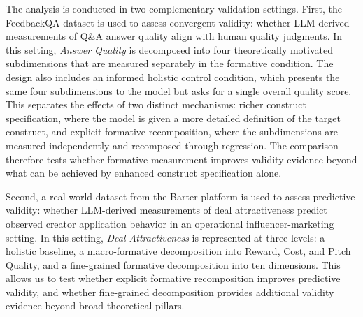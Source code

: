 

The analysis is conducted in two complementary validation settings. First, the FeedbackQA dataset \citep{li_using_2022} is used to assess convergent validity: whether LLM-derived measurements of Q\&A answer quality align with human quality judgments. In this setting, \textit{Answer Quality} is decomposed into four theoretically motivated subdimensions that are measured separately in the formative condition. The design also includes an informed holistic control condition, which presents the same four subdimensions to the model but asks for a single overall quality score. This separates the effects of two distinct mechanisms: richer construct specification, where the model is given a more detailed definition of the target construct, and explicit formative recomposition, where the subdimensions are measured independently and recomposed through regression. The comparison therefore tests whether formative measurement improves validity evidence beyond what can be achieved by enhanced construct specification alone.

Second, a real-world dataset from the Barter platform is used to assess predictive validity: whether LLM-derived measurements of deal attractiveness predict observed creator application behavior in an operational influencer-marketing setting. In this setting, \textit{Deal Attractiveness} is represented at three levels: a holistic baseline, a macro-formative decomposition into Reward, Cost, and Pitch Quality, and a fine-grained formative decomposition into ten dimensions. This allows us to test whether explicit formative recomposition improves predictive validity, and whether fine-grained decomposition provides additional validity evidence beyond broad theoretical pillars.


